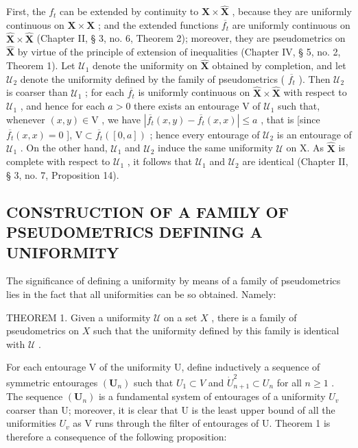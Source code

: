 First, the \(f_{t}\) can be extended by continuity to \(\hat{\mathbf{X}}\times\hat{\mathbf{X}}\) , because they are uniformly continuous on \(\mathbf{X}\times\mathbf{X}\) ; and the extended functions \(\overline{f_{t}}\) are uniformly continuous on \(\hat{\mathbf{X}}\times\hat{\mathbf{X}}\) (Chapter II, § 3, no. 6, Theorem 2); moreover, they are pseudometrics on \(\hat{\mathbf{X}}\) by virtue of the principle of extension of inequalities (Chapter IV, § 5, no. 2, Theorem 1). Let \(\mathcal{U}_{1}\) denote the uniformity on \(\hat{\mathbf{X}}\) obtained by completion, and let \(\mathcal{U}_{2}\) denote the uniformity defined by the family of pseudometrics ( \(\overline{f_{t}}\) ). Then \(\mathcal{U}_{2}\) is coarser than \(\mathcal{U}_{1}\) ; for each \(\overline{f_{t}}\) is uniformly continuous on \(\hat{\mathbf{X}}\times\hat{\mathbf{X}}\) with respect to \(\mathcal{U}_{1}\) , and hence for each \(a>0\) there exists an entourage V of \(\mathcal{U}_{1}\) such that, whenever \((x,y)\in\mathrm{V}\) , we have \(|\overline{f_{t}}(x,y)-\overline{f_{t}}(x,x)|\leqslant a\) , that is {[}since \(\overline{f_{t}}(x,x)=0\) {]}, \(\mathrm{V}\subset\overline{f_{t}}([0,a])\) ; hence every entourage of \(\mathcal{U}_{2}\) is an entourage of \(\mathcal{U}_{1}\) . On the other hand, \(\mathcal{U}_{1}\) and \(\mathcal{U}_{2}\) induce the same uniformity \(\mathcal{U}\) on X. As \(\hat{\mathbf{X}}\) is complete with respect to \(\mathcal{U}_{1}\) , it follows that \(\mathcal{U}_{1}\) and \(\mathcal{U}_{2}\) are identical (Chapter II, § 3, no. 7, Proposition 14).

\subsection{CONSTRUCTION OF A FAMILY OF PSEUDOMETRICS DEFINING A UNIFORMITY}

The significance of defining a uniformity by means of a family of pseudometrics lies in the fact that all uniformities can be so obtained. Namely:

THEOREM 1. Given a uniformity \(\mathcal{U}\) on a set \(X\) , there is a family of pseudometrics on \(X\) such that the uniformity defined by this family is identical with \(\mathcal{U}\) .

For each entourage V of the uniformity U, define inductively a sequence of symmetric entourages \((\mathbf{U}_{n})\) such that \(U_{1} \subset V\) and \(\dot{U}_{n+1}^{2} \subset U_{n}\) for all \(n \geqslant 1\) . The sequence \((\mathbf{U}_{n})\) is a fundamental system of entourages of a uniformity \(U_{v}\) coarser than U; moreover, it is clear that U is the least upper bound of all the uniformities \(U_{v}\) as V runs through the filter of entourages of U. Theorem 1 is therefore a consequence of the following proposition:

